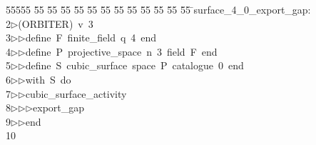 %
%
\begin{tabbing}
55555 \= 55 \= 55 \= 55 \= 55 \= 55 \= 55 \= 55 \= 55 \= 55 \= 55 \= 55 \= 55 \= \>surface\_4\_0\_export\_gap:\\[0pt]
2\>$\triangleright$\>(ORBITER)\ v\ 3\ \\[0pt]
3\>$\triangleright$\>$\triangleright$\>define\ F\ finite\_field\ q\ 4\ end\ \\[0pt]
4\>$\triangleright$\>$\triangleright$\>define\ P\ projective\_space\ n\ 3\ field\ F\ end\ \\[0pt]
5\>$\triangleright$\>$\triangleright$\>define\ S\ cubic\_surface\ space\ P\ catalogue\ 0\ end\ \\[0pt]
6\>$\triangleright$\>$\triangleright$\>with\ S\ do\ \\[0pt]
7\>$\triangleright$\>$\triangleright$\>cubic\_surface\_activity\ \\[0pt]
8\>$\triangleright$\>$\triangleright$\>$\triangleright$\>export\_gap\ \\[0pt]
9\>$\triangleright$\>$\triangleright$\>end\\[0pt]
10\>\end{tabbing}
